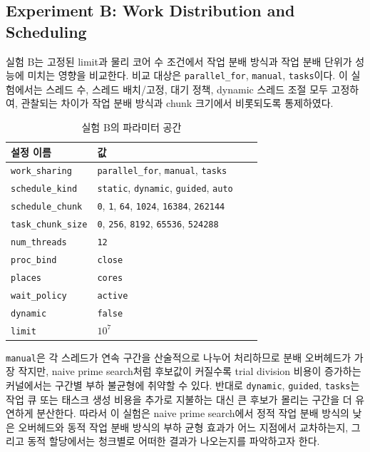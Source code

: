 \documentclass[11pt,a4paper]{article}
\begin{document}
\subsection{Experiment B: Work Distribution and Scheduling}

실험 B는 고정된 limit과 물리 코어 수 조건에서 작업 분배 방식과 작업 분배 단위가 성능에 미치는 영향을 비교한다. 비교 대상은 \texttt{parallel\_for}, \texttt{manual}, \texttt{tasks}이다. 이 실험에서는 스레드 수, 스레드 배치/고정, 대기 정책, dynamic 스레드 조절 모두 고정하여, 관찰되는 차이가 작업 분배 방식과 chunk 크기에서 비롯되도록 통제하였다.

\begin{table}[h]
\centering
\begin{tabular}{lp{0.70\linewidth}}
\toprule
설정 이름 & 값 \\
\midrule
\texttt{work\_sharing} & \texttt{parallel\_for}, \texttt{manual}, \texttt{tasks} \\
\texttt{schedule\_kind} & \texttt{static}, \texttt{dynamic}, \texttt{guided}, \texttt{auto} \\
\texttt{schedule\_chunk} & \texttt{0}, \texttt{1}, \texttt{64}, \texttt{1024}, \texttt{16384}, \texttt{262144} \\
\texttt{task\_chunk\_size} & \texttt{0}, \texttt{256}, \texttt{8192}, \texttt{65536}, \texttt{524288} \\
\texttt{num\_threads} & \texttt{12} \\
\texttt{proc\_bind} & \texttt{close} \\
\texttt{places} & \texttt{cores} \\
\texttt{wait\_policy} & \texttt{active} \\
\texttt{dynamic} & \texttt{false} \\
\texttt{limit} & $10^7$ \\
\bottomrule
\end{tabular}
\caption{실험 B의 파라미터 공간}
\label{tab:expB-combos}
\end{table}

\texttt{manual}은 각 스레드가 연속 구간을 산술적으로 나누어 처리하므로
분배 오버헤드가 가장 작지만, naive prime search처럼 후보값이 커질수록
trial division 비용이 증가하는 커널에서는 구간별 부하 불균형에 취약할 수
있다. 반대로 \texttt{dynamic}, \texttt{guided}, \texttt{tasks}는 작업 큐 또는
태스크 생성 비용을 추가로 지불하는 대신 큰 후보가 몰리는 구간을 더 유연하게
분산한다. 따라서 이 실험은 naive prime search에서 정적 작업 분배 방식의 낮은 오버헤드와
동적 작업 분배 방식의 부하 균형 효과가 어느 지점에서 교차하는지, 그리고 동적 할당에서는 청크별로 어떠한 결과가 나오는지를 파악하고자 한다.
\end{document}
